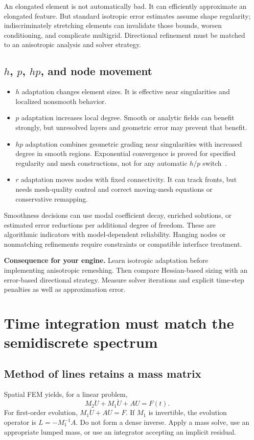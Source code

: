 \documentclass[11pt,a4paper]{article}
\newcommand{\decision}[1]{\par\smallskip\noindent\textcolor{accent}{\textbf{Consequence for your engine.}} #1\par}
\begin{document}
An elongated element is not automatically bad. It can efficiently approximate an elongated feature. But standard isotropic error estimates assume shape regularity; indiscriminately stretching elements can invalidate those bounds, worsen conditioning, and complicate multigrid. Directional refinement must be matched to an anisotropic analysis and solver strategy.

\subsection{\texorpdfstring{$h$, $p$, $hp$}{h, p, hp}, and node movement}
\begin{itemize}
\item $h$ adaptation changes element sizes. It is effective near singularities and localized nonsmooth behavior.
\item $p$ adaptation increases local degree. Smooth or analytic fields can benefit strongly, but unresolved layers and geometric error may prevent that benefit.
\item $hp$ adaptation combines geometric grading near singularities with increased degree in smooth regions. Exponential convergence is proved for specified regularity and mesh constructions, not for any automatic $h/p$ switch~\cite{hp}.
\item $r$ adaptation moves nodes with fixed connectivity. It can track fronts, but needs mesh-quality control and correct moving-mesh equations or conservative remapping.
\end{itemize}
Smoothness decisions can use modal coefficient decay, enriched solutions, or estimated error reductions per additional degree of freedom. These are algorithmic indicators with model-dependent reliability. Hanging nodes or nonmatching refinements require constraints or compatible interface treatment.

\decision{Learn isotropic adaptation before implementing anisotropic remeshing. Then compare Hessian-based sizing with an error-based directional strategy. Measure solver iterations and explicit time-step penalties as well as approximation error.}

\section{Time integration must match the semidiscrete spectrum}\label{sec:time}
\subsection{Method of lines retains a mass matrix}
Spatial FEM yields, for a linear problem,
\begin{equation}\label{eq:mol}
M_2\ddot U+M_1\dot U+AU=F(t).
\end{equation}
For first-order evolution, $M_1\dot U+AU=F$. If $M_1$ is invertible, the evolution operator is $L=-M_1^{-1}A$. Do not form a dense inverse. Apply a mass solve, use an appropriate lumped mass, or use an integrator accepting an implicit residual.
\end{document}
